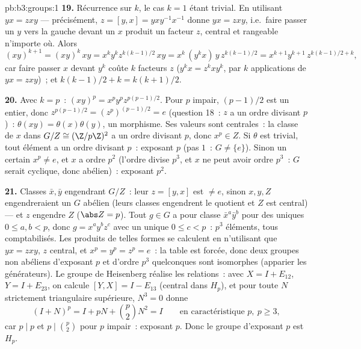 \begin{solution}{pb:b3:groups:1}
\textbf{19.} Récurrence sur $k$, le cas $k = 1$ étant trivial. En
utilisant $yx = zxy$ --- précisément, $z = [y, x] =
yxy^{-1}x^{-1}$ donne $yx = zxy$, i.e.\ faire passer un $y$ vers
la gauche devant un $x$ produit un facteur $z$, central et
rangeable n'importe où. Alors
\[
(xy)^{k+1} = (xy)^k\,xy = x^ky^kz^{k(k-1)/2}\,xy
= x^k\,(y^kx)\,y\,z^{k(k-1)/2}
= x^{k+1}y^{k+1}\,z^{k(k-1)/2 + k},
\]
car faire passer $x$ devant $y^k$ coûte $k$ facteurs $z$ ($y^kx =
z^kxy^k$, par $k$ applications de $yx = zxy$)~; et $k(k-1)/2 + k
= k(k+1)/2$.

\textbf{20.} Avec $k = p$~: $(xy)^p = x^py^pz^{p(p-1)/2}$. Pour
$p$ impair, $(p-1)/2$ est un entier, donc $z^{p(p-1)/2} =
(z^p)^{(p-1)/2} = e$ (question 18~: $z$ a un ordre divisant
$p$)~: $\theta(xy) = \theta(x)\theta(y)$, un morphisme. Ses
valeurs sont centrales~: la classe de $x$ dans $G/Z \cong
(\Z/p\Z)^2$ a un ordre divisant $p$, donc $x^p \in Z$. Si
$\theta$ est trivial, tout élément a un ordre divisant $p$~:
exposant $p$ (pas $1$~: $G \neq \{e\}$). Sinon un certain $x^p
\neq e$, et $x$ a ordre $p^2$ (l'ordre divise $p^3$, et $x$ ne
peut avoir ordre $p^3$~: $G$ serait cyclique, donc abélien)~:
exposant $p^2$.

\textbf{21.} Classes $\bar x, \bar y$ engendrant $G/Z$~: leur
 $z = [y, x]$ est $\neq e$, sinon $x, y, Z$
engendreraient un $G$ abélien (leurs classes engendrent le
quotient et $Z$ est central) --- et $z$ engendre $Z$ ($\abs Z =
p$). Tout $g \in G$ a pour classe $\bar x^a\bar y^b$ pour des
uniques $0 \leq a, b < p$, donc $g = x^ay^bz^c$ avec un unique
$0 \leq c < p$~: $p^3$ éléments, tous comptabilisés. Les
produits de telles formes  se calculent en n'utilisant
que $yx = zxy$, $z$ central, et $x^p = y^p = z^p = e$~: la table
est forcée, donc deux groupes non abéliens d'exposant $p$ et
d'ordre $p^3$ quelconques sont isomorphes (apparier les
générateurs). Le groupe de Heisenberg réalise les relations~:
avec $X = I + E_{12}$, $Y = I + E_{23}$, on calcule $[Y, X] = I
- E_{13}$ (central dans $H_p$), et pour toute $N$ strictement
triangulaire supérieure, $N^3 = 0$ donne
\[
(I + N)^p = I + pN + \binom p2N^2 = I
\qquad\text{en caractéristique } p,\ p \geq 3,
\]
car $p \mid p$ et $p \mid \binom p2$ pour $p$ impair~: exposant
$p$. Donc le groupe d'exposant $p$ est $H_p$.


\end{solution}
